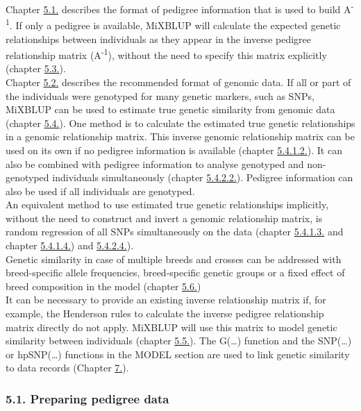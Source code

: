Chapter \hyperref[Gene02]{5.1.} describes the format of pedigree
information that is used to build A\textsuperscript{-1}. If only a
pedigree is available, MiXBLUP will calculate the expected genetic
relationships between individuals as they appear in the inverse pedigree
relationship matrix (A\textsuperscript{-1}), without the need to specify
this matrix explicitly (chapter \hyperref[Gene26]{5.3.}).\\
Chapter \hyperref[Gene21]{5.2.} describes the recommended format of
genomic data. If all or part of the individuals were genotyped for many
genetic markers, such as SNPs, MiXBLUP can be used to estimate true
genetic similarity from genomic data (chapter \hyperref[Gene29]{5.4.}).
One method is to calculate the estimated true genetic relationships in a
genomic relationship matrix. This inverse genomic relationship matrix
can be used on its own if no pedigree information is available (chapter
\hyperref[Gene32]{5.4.1.2.}). It can also be combined with pedigree
information to analyse genotyped and non-genotyped individuals
simultaneously (chapter \hyperref[Gene37]{5.4.2.2.}). Pedigree
information can also be used if all individuals are genotyped.\\
An equivalent method to use estimated true genetic relationships
implicitly, without the need to construct and invert a genomic
relationship matrix, is random regression of all SNPs simultaneously on
the data (chapter \hyperref[Gene33]{5.4.1.3.} and chapter
\hyperref[Gene34]{5.4.1.4.}) and \hyperref[Gene47]{5.4.2.4.}).\\
Genetic similarity in case of multiple breeds and crosses can be
addressed with breed-specific allele frequencies, breed-specific genetic
groups or a fixed effect of breed composition in the model (chapter
\hyperref[Gene58]{5.6.})\\
It can be necessary to provide an existing inverse relationship matrix
if, for example, the Henderson rules to calculate the inverse pedigree
relationship matrix directly do not apply. MiXBLUP will use this matrix
to model genetic similarity between individuals (chapter
\hyperref[Gene54]{5.5.}). The G(\ldots) function and the SNP(\ldots) or
hpSNP(\ldots) functions in the MODEL section are used to link genetic
similarity to data records (Chapter \hyperref[Stat01]{7.}).

\subsubsection{5.1. Preparing pedigree data}\label{Gene02}

